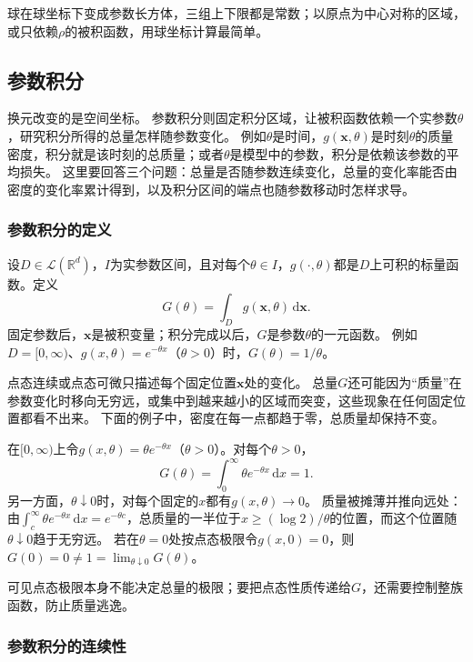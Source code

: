 球在球坐标下变成参数长方体，三组上下限都是常数；以原点为中心对称的区域，或只依赖$\rho$的被积函数，用球坐标计算最简单。

\subsection{参数积分}
\label{sec:multivariable-parameter-integrals}

换元改变的是空间坐标。
参数积分则固定积分区域，让被积函数依赖一个实参数$\theta$，研究积分所得的总量怎样随参数变化。
例如$\theta$是时间，$g(\bm x,\theta)$是时刻$\theta$的质量密度，积分就是该时刻的总质量；或者$\theta$是模型中的参数，积分是依赖该参数的平均损失。
这里要回答三个问题：总量是否随参数连续变化，总量的变化率能否由密度的变化率累计得到，以及积分区间的端点也随参数移动时怎样求导。

\subsubsection{参数积分的定义}

设$D\in\mathcal L(\mathbb R^d)$，$I$为实参数区间，且对每个$\theta\in I$，$g(\cdot,\theta)$都是$D$上可积的标量函数。定义
\[
 G(\theta)=\int_Dg(\bm x,\theta)\,\mathrm d\bm x.
\]
固定参数后，$\bm x$是被积变量；积分完成以后，$G$是参数$\theta$的一元函数。
例如$D=[0,\infty)$、$g(x,\theta)=e^{-\theta x}$（$\theta>0$）时，$G(\theta)=1/\theta$。

点态连续或点态可微只描述每个固定位置$\bm x$处的变化。
总量$G$还可能因为“质量”在参数变化时移向无穷远，或集中到越来越小的区域而突变，这些现象在任何固定位置都看不出来。
下面的例子中，密度在每一点都趋于零，总质量却保持不变。
\begin{example}
\label{ex:region-escaping-mass}
在$[0,\infty)$上令$g(x,\theta)=\theta e^{-\theta x}$（$\theta>0$）。对每个$\theta>0$，
\[
 G(\theta)=\int_0^\infty\theta e^{-\theta x}\,\mathrm dx=1.
\]
另一方面，$\theta\downarrow0$时，对每个固定的$x$都有$g(x,\theta)\to0$。
质量被摊薄并推向远处：由$\int_c^\infty\theta e^{-\theta x}\,\mathrm dx=e^{-\theta c}$，总质量的一半位于$x\geq(\log2)/\theta$的位置，而这个位置随$\theta\downarrow0$趋于无穷远。
若在$\theta=0$处按点态极限令$g(x,0)=0$，则$G(0)=0\neq1=\lim_{\theta\downarrow0}G(\theta)$。
\end{example}

可见点态极限本身不能决定总量的极限；要把点态性质传递给$G$，还需要控制整族函数，防止质量逃逸。

\subsubsection{参数积分的连续性}

